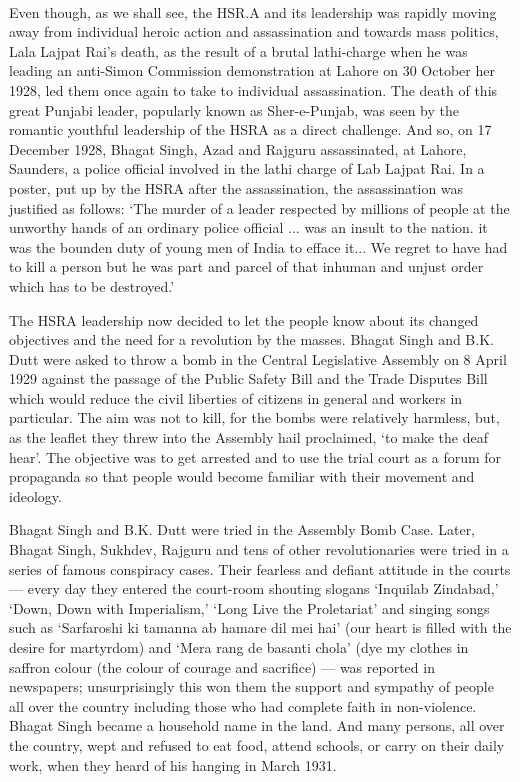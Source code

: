 \paragraph*{}


Even though, as we shall see, the HSR.A and its leadership was rapidly moving away from individual heroic action and assassination and towards mass politics, Lala Lajpat Rai's death, as the result of a brutal lathi-charge when he was leading an anti-Simon Commission demonstration at Lahore on 30 October her 1928, led them once again to take to individual assassination. The death of this great Punjabi leader, popularly known as Sher-e-Punjab, was seen by the romantic youthful leadership of the HSRA as a direct challenge. And so, on 17 December 1928, Bhagat Singh, Azad and Rajguru assassinated, at Lahore, Saunders, a police official involved in the lathi charge of Lab Lajpat Rai. In a poster, put up by the HSRA after the assassination, the assassination was justified as follows: `The murder of a leader respected by millions of people at the unworthy hands of an ordinary police official ... was an insult to the nation. it was the bounden duty of young men of India to efface it... We regret to have had to kill a person but he was part and parcel of that inhuman and unjust order which has to be destroyed.'

The HSRA leadership now decided to let the people know about its changed objectives and the need for a revolution by the masses. Bhagat Singh and B.K. Dutt were asked to throw a bomb in the Central Legislative Assembly on 8 April 1929 against the passage of the Public Safety Bill and the Trade Disputes Bill which would reduce the civil liberties of citizens in general and workers in particular. The aim was not to kill, for the bombs were relatively harmless, but, as the leaflet they threw into the Assembly hail proclaimed, `to make the deaf hear'. The objective was to get arrested and to use the trial court as a forum for propaganda so that people would become familiar with their movement and ideology.

Bhagat Singh and B.K. Dutt were tried in the Assembly Bomb Case. Later, Bhagat Singh, Sukhdev, Rajguru and tens of other revolutionaries were tried in a series of famous conspiracy cases. Their fearless and defiant attitude in the courts --- every day they entered the court-room shouting slogans `Inquilab Zindabad,' `Down, Down with Imperialism,' `Long Live the Proletariat' and singing songs such as `Sarfaroshi ki tamanna ab hamare dil mei hai' (our heart is filled with the desire for martyrdom) and `Mera rang de basanti chola' (dye my clothes in saffron colour (the colour of courage and sacrifice) --- was reported in newspapers; unsurprisingly this won them the support and sympathy of people all over the country including those who had complete faith in non-violence. Bhagat Singh became a household name in the land. And many persons, all over the country, wept and refused to eat food, attend schools, or carry on their daily work, when they heard of his hanging in March 1931.

